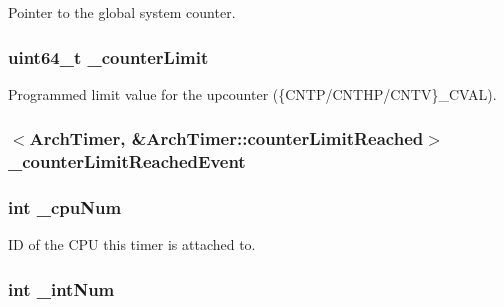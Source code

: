 Pointer to the global system counter. \hypertarget{classGenericTimer_1_1ArchTimer_aabfe56278c393b1a362bf291f2d5fa1b}{
\subsubsection[{\_\-counterLimit}]{\setlength{\rightskip}{0pt plus 5cm}uint64\_\-t {\bf \_\-counterLimit}}}
\label{classGenericTimer_1_1ArchTimer_aabfe56278c393b1a362bf291f2d5fa1b}


Programmed limit value for the upcounter (\{CNTP/CNTHP/CNTV\}\_\-CVAL). \hypertarget{classGenericTimer_1_1ArchTimer_af3d9b927e7a4e847638d2703b3e9053c}{
\subsubsection[{\_\-counterLimitReachedEvent}]{$<${\bf ArchTimer}, \&ArchTimer::counterLimitReached$>$ {\bf \_\-counterLimitReachedEvent}}}
\label{classGenericTimer_1_1ArchTimer_af3d9b927e7a4e847638d2703b3e9053c}
\hypertarget{classGenericTimer_1_1ArchTimer_ada4874eb9ccf0bd190c82504cb7f00dc}{
\subsubsection[{\_\-cpuNum}]{\setlength{\rightskip}{0pt plus 5cm}int {\bf \_\-cpuNum}}}
\label{classGenericTimer_1_1ArchTimer_ada4874eb9ccf0bd190c82504cb7f00dc}


ID of the CPU this timer is attached to. \hypertarget{classGenericTimer_1_1ArchTimer_a898e65f2e5a34e6e211acb79ab3aaae2}{
\subsubsection[{\_\-intNum}]{\setlength{\rightskip}{0pt plus 5cm}int {\bf \_\-intNum}}}
\label{classGenericTimer_1_1ArchTimer_a898e65f2e5a34e6e211acb79ab3aaae2}


